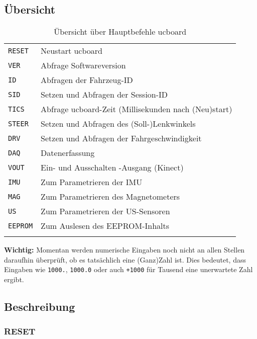 \subsection{Übersicht}

\begin{table}[htbp]%
	\centering
	\caption{Übersicht über Hauptbefehle ucboard}
	\label{tab:Comm:Cmds}
	\begin{tabular}{ll}
		\mytoprule
		\verb|RESET| & Neustart ucboard \\
		\verb|VER| & Abfrage Softwareversion \\
		\verb|ID|	& Abfragen der Fahrzeug-ID \\
		\verb|SID| & Setzen und Abfragen der Session-ID \\
		\verb|TICS| & Abfrage ucboard-Zeit (Millisekunden nach (Neu)start) \\
		\verb|STEER| & Setzen und Abfragen des (Soll-)Lenkwinkels \\
		\verb|DRV| & Setzen und Abfragen der Fahrgeschwindigkeit \\
		\verb|DAQ| & Datenerfassung \\
		\verb|VOUT| & Ein- und Ausschalten \valunit{12}{V}-Ausgang (Kinect) \\
		\texttt{IMU} & Zum Parametrieren der IMU \\
		\texttt{MAG} & Zum Parametrieren des Magnetometers \\
		\texttt{US} & Zum Parametrieren der US-Sensoren \\
		\textcolor[rgb]{0.75,0.75,0.75}{\texttt{EEPROM}} & \textcolor[rgb]{0.75,0.75,0.75}{Zum Auslesen des EEPROM-Inhalts}\\
		\mybottomrule
	\end{tabular}
\end{table}



\textbf{Wichtig:} Momentan werden numerische Eingaben noch nicht an allen Stellen daraufhin überprüft, ob es tatsächlich eine (Ganz)Zahl ist. Dies bedeutet, dass \zB Eingaben wie \verb|1000.|, \verb|1000.0| oder auch \verb|+1000| für Tausend eine unerwartete Zahl ergibt.


\subsection{Beschreibung}

\subsubsection{RESET}

